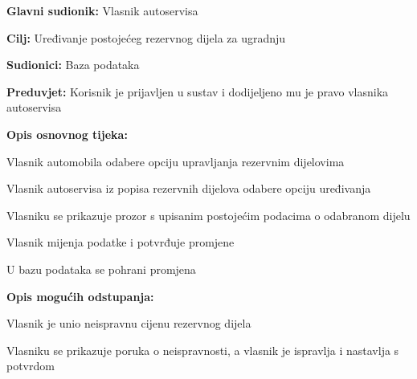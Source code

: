 					\noindent {}
					\begin{packed_item}

						\item \textbf{Glavni sudionik: } Vlasnik autoservisa
						\item  \textbf{Cilj:} Uređivanje postojećeg rezervnog dijela za ugradnju
						\item  \textbf{Sudionici:} Baza podataka
						\item  \textbf{Preduvjet:} Korisnik je prijavljen u sustav i dodijeljeno mu je pravo vlasnika autoservisa
						\item  \textbf{Opis osnovnog tijeka:}

						\item[] \begin{packed_enum}

							\item Vlasnik automobila odabere opciju upravljanja rezervnim dijelovima
							\item Vlasnik autoservisa iz popisa rezervnih dijelova odabere opciju uređivanja
							\item Vlasniku se prikazuje prozor s upisanim postojećim podacima o odabranom dijelu
							\item Vlasnik mijenja podatke i potvrđuje promjene
							\item U bazu podataka se pohrani promjena

						\end{packed_enum}

						\item  \textbf{Opis mogućih odstupanja:}
						\item[] \begin{packed_item}
							\item[4.a] Vlasnik je unio neispravnu cijenu rezervnog dijela
							\item[] \begin{packed_enum}
								\item Vlasniku se prikazuje poruka o neispravnosti, a vlasnik je ispravlja i nastavlja s potvrdom
							\end{packed_enum}
						\end{packed_item}

					\end{packed_item}


